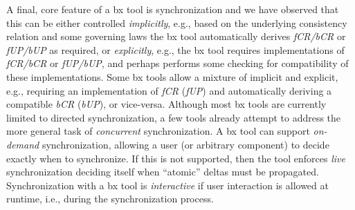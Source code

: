 A final, core feature of a bx tool is synchronization and we have observed that this can be either controlled \emph{implicitly}, e.g., based on the underlying consistency relation and some governing laws the bx tool automatically derives \emph{fCR/bCR} or \emph{fUP/bUP} as required, or \emph{explicitly}, e.g., the bx tool requires implementations of \emph{fCR/bCR} or \emph{fUP/bUP}, and perhaps performs some checking for compatibility of these implementations.
Some bx tools allow a mixture of implicit and explicit, e.g., requiring an implementation of \emph{fCR} (\emph{fUP}) and automatically deriving a compatible \emph{bCR} (\emph{bUP}), or vice-versa.
Although most bx tools are currently limited to directed synchronization, a few tools already attempt to address the more general task of \emph{concurrent} synchronization.
A bx tool can support \emph{on-demand} synchronization, allowing a user (or arbitrary component) to decide exactly when to synchronize.
If this is not supported, then the tool enforces \emph{live} synchronization deciding itself when ``atomic'' deltas must be propagated.
Synchronization with a bx tool is \emph{interactive} if user interaction is allowed at runtime, i.e., during the synchronization process.
